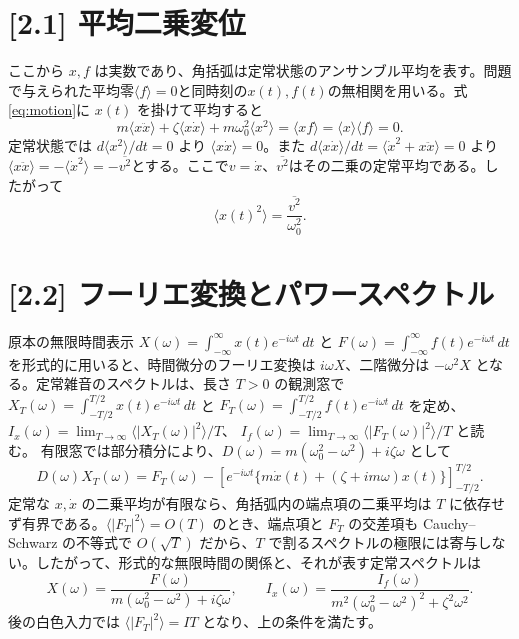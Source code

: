 \documentclass[10pt,a4paper]{article}
\begin{document}
\section*{[2.1] 平均二乗変位}
ここから $x,f$ は実数であり、角括弧は定常状態のアンサンブル平均を表す。問題で与えられた平均零$\langle f\rangle=0$と同時刻の$x(t),f(t)$の無相関を用いる。式\eqref{eq:motion}に $x(t)$ を掛けて平均すると
\[
 m\langle x\ddot x\rangle+\zeta\langle x\dot x\rangle+m\omega_0^2\langle x^2\rangle=\langle xf\rangle=\langle x\rangle\langle f\rangle=0.
\]
定常状態では $d\langle x^2\rangle/dt=0$ より $\langle x\dot x\rangle=0$。また $d\langle x\dot x\rangle/dt=\langle\dot x^2+x\ddot x\rangle=0$ より $\langle x\ddot x\rangle=-\langle\dot x^2\rangle=-\overline{v^2}$とする。ここで$v=\dot x$、$\overline{v^2}$はその二乗の定常平均である。したがって
\begin{equation}
\boxed{\langle x(t)^2\rangle=\frac{\overline{v^2}}{\omega_0^2}}.
\label{eq:x2}
\end{equation}

\section*{[2.2] フーリエ変換とパワースペクトル}
原本の無限時間表示 $X(\omega)=\int_{-\infty}^{\infty}x(t)e^{-i\omega t}\,dt$ と $F(\omega)=\int_{-\infty}^{\infty}f(t)e^{-i\omega t}\,dt$ を形式的に用いると、時間微分のフーリエ変換は $i\omega X$、二階微分は $-\omega^2X$ となる。定常雑音のスペクトルは、長さ $T>0$ の観測窓で
$X_T(\omega)=\int_{-T/2}^{T/2}x(t)e^{-i\omega t}\,dt$ と
$F_T(\omega)=\int_{-T/2}^{T/2}f(t)e^{-i\omega t}\,dt$ を定め、
$I_x(\omega)=\lim_{T\to\infty}\langle|X_T(\omega)|^2\rangle/T$、
$I_f(\omega)=\lim_{T\to\infty}\langle|F_T(\omega)|^2\rangle/T$ と読む。
有限窓では部分積分により、$D(\omega)=m(\omega_0^2-\omega^2)+i\zeta\omega$ として
\[
 D(\omega)X_T(\omega)=F_T(\omega)
 -\left[e^{-i\omega t}\{m\dot x(t)+(\zeta+i m\omega)x(t)\}\right]_{-T/2}^{T/2}.
\]
定常な $x,\dot x$ の二乗平均が有限なら、角括弧内の端点項の二乗平均は $T$ に依存せず有界である。$\langle|F_T|^2\rangle=O(T)$ のとき、端点項と $F_T$ の交差項も Cauchy--Schwarz の不等式で $O(\sqrt T)$ だから、$T$ で割るスペクトルの極限には寄与しない。したがって、形式的な無限時間の関係と、それが表す定常スペクトルは
\begin{equation}
\boxed{X(\omega)=\frac{F(\omega)}{m(\omega_0^2-\omega^2)+i\zeta\omega}},\qquad
\boxed{I_x(\omega)=\frac{I_f(\omega)}{m^2(\omega_0^2-\omega^2)^2+\zeta^2\omega^2}}.
\label{eq:spectrum}
\end{equation}
後の白色入力では $\langle|F_T|^2\rangle=IT$ となり、上の条件を満たす。
\end{document}
